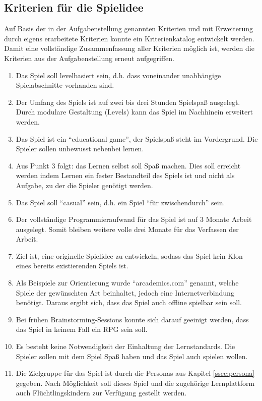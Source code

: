 \subsection{Kriterien für die Spielidee}\label{ssec:kriterien}
	Auf Basis der in der Aufgabenstellung genannten Kriterien und mit Erweiterung durch eigens erarbeitete Kriterien konnte ein Kriterienkatalog entwickelt werden. Damit eine vollständige Zusammenfassung aller Kriterien möglich ist, werden die Kriterien aus der Aufgabenstellung erneut aufgegriffen.
	\begin{enumerate}
		\item{Das Spiel soll levelbasiert sein, d.h. dass voneinander unabhängige Spielabschnitte vorhanden sind.}
		\item{Der Umfang des Spiels ist auf zwei bis drei Stunden Spielspaß ausgelegt. Durch modulare Gestaltung (Levels) kann das Spiel im Nachhinein erweitert werden.}
		\item{Das Spiel ist ein \enquote{educational game}, der Spielspaß steht im Vordergrund. Die Spieler sollen unbewusst nebenbei lernen.}
		\item{Aus Punkt 3 folgt: das Lernen selbst soll Spaß machen. Dies soll erreicht werden indem Lernen ein fester Bestandteil des Spiels ist und nicht als Aufgabe, zu der die Spieler genötigt werden.}
		\item{Das Spiel soll \enquote{casual} sein, d.h. ein Spiel \enquote{für zwischendurch} sein.}
		\item{Der vollständige Programmieraufwand für das Spiel ist auf 3 Monate Arbeit ausgelegt. Somit bleiben weitere volle drei Monate für das Verfassen der Arbeit.}
		\item{Ziel ist, eine originelle Spielidee zu entwickeln, sodass das Spiel kein Klon eines bereits existierenden Spiels ist.}
		\item{Als Beispiele zur Orientierung wurde \enquote{arcademics.com} genannt, welche Spiele der gewünschten Art beinhaltet, jedoch eine Internetverbindung benötigt. Daraus ergibt sich, dass das Spiel auch offline spielbar sein soll.}
		\item{Bei frühen Brainstorming-Sessions konnte sich darauf geeinigt werden, dass das Spiel in keinem Fall ein \gls{RPG} sein soll.}
		\item{Es besteht keine Notwendigkeit der Einhaltung der Lernstandards. Die Spieler sollen mit dem Spiel Spaß haben und das Spiel auch spielen wollen.}
		\item{Die Zielgruppe für das Spiel ist durch die Personas aus Kapitel \ref{ssec:persona} gegeben. Nach Möglichkeit soll dieses Spiel und die zugehörige Lernplattform auch Flüchtlingskindern zur Verfügung gestellt werden.}
	\end{enumerate}

